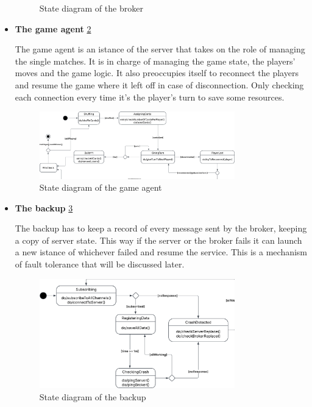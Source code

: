 \documentclass{scrartcl}
\begin{document}
\begin{itemize}
\begin{figure}[H]
    \caption{State diagram of the broker} 
    \label{fig:brokerStates}
  \end{figure}
  \item 
  \textbf{The game agent} \cref{fig:gameAgentStates} \par
  The game agent is an istance of the server that takes on the role of managing the single matches.
  It is in charge of managing the game state, the players' moves and the game logic. \newline
  It also preoccupies itself to reconnect the players and resume the game where it left off 
  in case of disconnection. Only checking each connection every time it's the player's turn to
  save some resources.
  \begin{figure}[H]
    \centering
    \includegraphics[width=0.8\textwidth]{figures/gameAgentStates.png}
    \caption{State diagram of the game agent} 
    \label{fig:gameAgentStates}
  \end{figure}
  \item 
  \textbf{The backup} \cref{fig:backupStates} \par
  The backup has to keep a record of every message sent by the broker, keeping a copy of server state. \newline
  This way if the server or the broker fails it can launch a new istance of whichever failed and resume 
  the service. This is a mechanism of fault tolerance that will be discussed later.
  \begin{figure}[H]
    \centering
    \includegraphics[width=0.8\textwidth]{figures/backupStates.png}
    \caption{State diagram of the backup} 
    \label{fig:backupStates}
  \end{figure}
\end{itemize}
\end{document}
